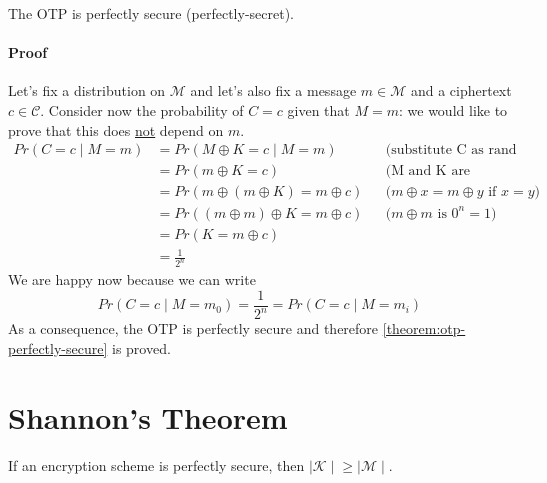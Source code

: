 \documentclass[../main]{subfiles}
\begin{document}
\begin{theorem}
    \label{theorem:otp-perfectly-secure}
    The OTP is perfectly secure (perfectly-secret).
\end{theorem}

\paragraph{Proof}
    Let's fix a distribution on $\mathcal{M}$ and let's also fix a message $m \in{} \mathcal{M}$ and a ciphertext $c \in{} \mathcal{C}$.
    Consider now the probability of $C=c$ given that $M=m$: we would like to prove that this does \underline{not} depend on $m$.
    \begin{align*}
        Pr(C=c \mid{} M=m) &= Pr(M \oplus{} K=c \mid{} M=m) && \text{(substitute C as rand var)} \\
        &= Pr(m \oplus{} K=c) && \text{(M and K are independent)} \\
        &= Pr(m \oplus{} (m \oplus{} K) = m \oplus{} c) && \text{($m \oplus{} x = m \oplus{} y$ if $x=y$)} \\
        &= Pr((m \oplus{} m)\oplus K = m \oplus{} c) && \text{($m \oplus m$ is $0^n=1$)} \\
        &= Pr(K=m \oplus{} c) \\
        &= \frac{1}{2^n}
    \end{align*}
    We are happy now because we can write $$Pr(C=c \mid{} M=m_0) = \frac{1}{2^n} = Pr(C=c \mid{} M=m_i)$$
    As a consequence, the OTP is perfectly secure and therefore \ref{theorem:otp-perfectly-secure} is proved.
\section{Shannon's Theorem}

\begin{theorem}
    \label{theorem:cardinality-key-message-set}
    If an encryption scheme is perfectly secure, then $\mid{} \mathcal{K}\mid{} \geq \mid{} \mathcal{M}\mid{} $.
\end{theorem}
\end{document}
